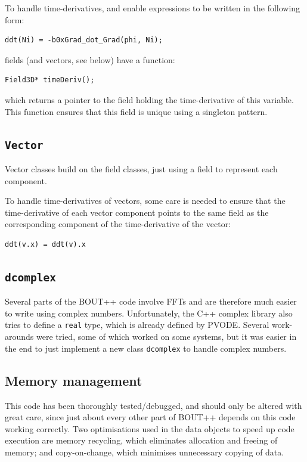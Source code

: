 \documentclass[12pt]{article}
\newcommand{\code}[1]{\texttt{#1}}
\begin{document}
To handle time-derivatives, and enable expressions to be written in the
following form:
\begin{lstlisting}
ddt(Ni) = -b0xGrad_dot_Grad(phi, Ni);
\end{lstlisting}
fields (and vectors, see below) have a function:
\begin{lstlisting}
Field3D* timeDeriv();
\end{lstlisting}
which returns a pointer to the field holding the time-derivative
of this variable. This function ensures that this field is unique
using a singleton pattern.

\subsection{\code{Vector}}
Vector classes build on the field classes, just using a field to represent
each component. 

To handle time-derivatives of vectors, some care is needed to ensure that
the time-derivative of each vector component points to the same
field as the corresponding component of the time-derivative of the vector:
\begin{lstlisting}
ddt(v.x) = ddt(v).x
\end{lstlisting}

\subsection{\code{dcomplex}}
Several parts of the BOUT++ code involve FFTs and are therefore much easier to
write using complex numbers. Unfortunately, the C++ complex library also tries
to define a \code{real} type, which is already defined by PVODE. Several
work-arounds were tried, some of which worked on some systems, but
it was easier in the end to just implement a new class \code{dcomplex} to
handle complex numbers.

\subsection{Memory management}
\label{sec:memorymanage}

This code has been thoroughly tested/debugged, and should only be altered
with great care, since just about every other part of BOUT++ depends on this code
working correctly. Two optimisations used in the data objects to speed up code execution
are memory recycling, which eliminates allocation and freeing of memory; and copy-on-change,
which minimises unnecessary copying of data.
\end{document}
